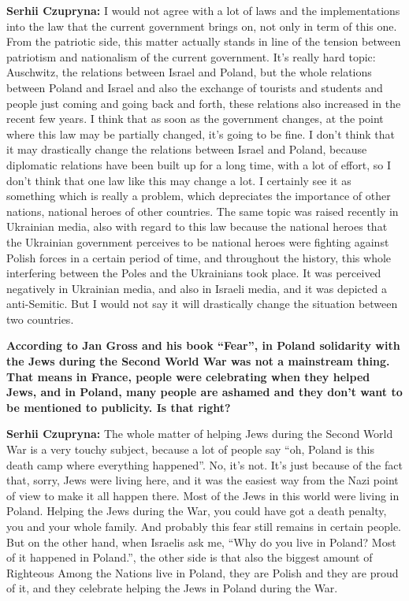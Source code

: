 \textbf{Serhii Czupryna:} I would not agree with a lot of laws and the implementations into the law that the current government brings on, not only in term of this one. From the patriotic side, this matter actually stands in line of the tension between patriotism and nationalism of the current government. It’s really hard topic: Auschwitz, the relations between Israel and Poland, but the whole relations between Poland and Israel and also the exchange of tourists and students and people just coming and going back and forth, these relations also increased in the recent few years. I think that as soon as the government changes, at the point where this law may be partially changed, it’s going to be fine. I don’t think that it may drastically change the relations between Israel and Poland, because diplomatic relations have been built up for a long time, with a lot of effort, so I don’t think that one law like this may change a lot. I certainly see it as something which is really a problem, which depreciates the importance of other nations, national heroes of other countries. The same topic was raised recently in Ukrainian media, also with regard to this law because the national heroes that the Ukrainian government perceives to be national heroes were fighting against Polish forces in a certain period of time, and throughout the history, this whole interfering between the Poles and the Ukrainians took place. It was perceived negatively in Ukrainian media, and also in Israeli media, and it was depicted a anti-Semitic. But I would not say it will drastically change the situation between two countries.\par
\textbf{According to Jan Gross and his book ``Fear'', in Poland solidarity with the Jews during the Second World War was not a mainstream thing. That means in France, people were celebrating when they helped Jews, and in Poland, many people are ashamed and they don’t want to be mentioned to publicity. Is that right?}\par
\textbf{Serhii Czupryna:} The whole matter of helping Jews during the Second World War is a very touchy subject, because a lot of people say ``oh, Poland is this death camp where everything happened''. No, it’s not. It’s just because of the fact that, sorry, Jews were living here, and it was the easiest way from the Nazi point of view to make it all happen there. Most of the Jews in this world were living in Poland. Helping the Jews during the War, you could have got a death penalty, you and your whole family. And probably this fear still remains in certain people. But on the other hand, when Israelis ask me, ``Why do you live in Poland? Most of it happened in Poland.'', the other side is that also the biggest amount of Righteous Among the Nations live in Poland, they are Polish and they are proud of it, and they celebrate helping the Jews in Poland during the War.\par
